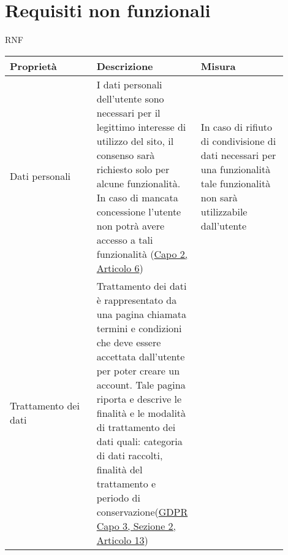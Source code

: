 \section{Requisiti non funzionali}
\label{secD2:RequisitiNonFunzionali}

\begin{listaPersonale}{RNF}

    \begin{tabular}{|p{0.3\linewidth}|p{0.3\linewidth}|p{0.3\linewidth}|}
        \hline
         \textbf{Proprietà}                                                                                                       &
        \textbf{Descrizione}                                                                                                                      &
        \textbf{Misura}                                                                                                                                                                                                        \\
        \hline
        Dati personali                                                                                                                            &
        I dati personali dell'utente sono necessari per il
        legittimo interesse di utilizzo del sito, il consenso
        sarà richiesto solo per alcune funzionalità. In caso di
        mancata concessione l'utente non potrà avere accesso a tali
        funzionalità (\href{https://eur-lex.europa.eu/legal-content/IT/TXT/?uri=uriserv:OJ.L_.2016.119.01.0001.01.ITA                             & toc=OJ:L:2016:119:TOC#d1e1898-1-1}{Capo 2, Articolo 6})                  &
        In caso di rifiuto di condivisione di dati necessari per
        una funzionalità tale funzionalità non sarà utilizzabile dall'utente                                                                                                                                                   \\
        \hline
        Trattamento dei dati                                                                                                                      &
        Trattamento dei dati è rappresentato da una pagina chiamata
        termini e condizioni che deve essere accettata dall'utente per
        poter creare un account. Tale pagina riporta e descrive le
        finalità e le modalità di trattamento dei dati quali: categoria
        di dati raccolti, finalità del
        trattamento e periodo di conservazione(\href{https://eur-lex.europa.eu/legal-content/IT/TXT/?uri=uriserv:OJ.L_.2016.119.01.0001.01.ITA    & toc=OJ:L:2016:119:TOC#d1e2261-1-1}{GDPR Capo 3, Sezione 2, Articolo 13}) &

\end{tabular}
\end{listaPersonale}
